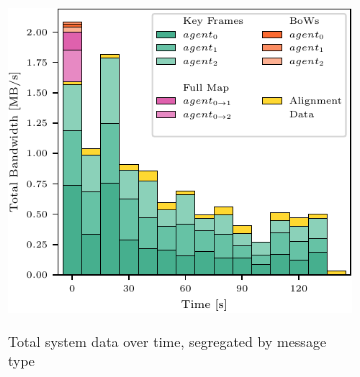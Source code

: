 \begin{figure}[h]
    \centering
    \begin{subfigure}[b]{0.55\linewidth}
        \centering
         {
            \includegraphics[width=\linewidth, valign=t]{figures/apr11_tum_room_trajectory_a_bandwith.pdf}
        }
        \caption{Total system data over time, segregated by message type}
    \end{subfigure}%
    ~
    \begin{subfigure}[b]{0.45\linewidth}
        \flushright
\end{subfigure}
\end{figure}

